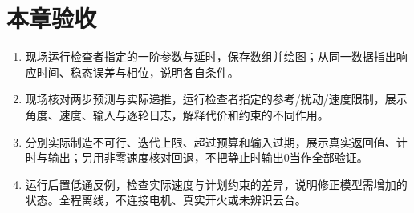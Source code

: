 \section{本章验收}
\begin{enumerate}
\item 现场运行检查者指定的一阶参数与延时，保存数组并绘图；从同一数据指出响应时间、稳态误差与相位，说明各自条件。
\item 现场核对两步预测与实际递推，运行检查者指定的参考/扰动/速度限制，展示角度、速度、输入与逐轮日志，解释代价和约束的不同作用。
\item 分别实际制造不可行、迭代上限、超过预算和输入过期，展示真实返回值、计时与输出；另用非零速度核对回退，不把静止时输出0当作全部验证。
\item 运行后置低通反例，检查实际速度与计划约束的差异，说明修正模型需增加的状态。全程离线，不连接电机、真实开火或未辨识云台。
\end{enumerate}
